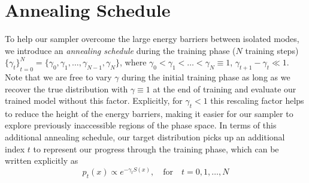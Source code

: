 \documentclass{article} %
\begin{document}
\section{\label{sec:annealing}Annealing Schedule}
%
To help our sampler overcome the large energy barriers between isolated modes, we introduce an \emph{annealing schedule}
during the training phase (\(N\) training steps) \({\{\gamma_{t}\}}_{t=0}^{N} = \{\gamma_{0}, \gamma_{1}, \ldots,
\gamma_{N-1}, \gamma_{N}\}\), where \(\gamma_{0} < \gamma_{1} < \ldots < \gamma_{N} \equiv 1\), \(\gamma_{t+1} -
\gamma_{t} \ll 1\).
%
Note that we are free to vary \(\gamma\) during the initial training phase as long as we recover the true distribution
with \(\gamma \equiv 1\) at the end of training and evaluate our trained model without this factor.
%
Explicitly, for \(\gamma_{t} < 1\) this rescaling factor helps to reduce the height of the energy barriers, making it
easier for our sampler to explore previously inaccessible regions of the phase space.
%
In terms of this additional annealing schedule, our target distribution picks up an additional index \(t\) to represent
our progress through the training phase, which can be written explicitly as 
%
\begin{equation}
   p_{t}(x)\propto e^{-\gamma_{t} S(x)},\quad\text{for}\quad t=0, 1, \ldots, N
   \label{eq:targetannealing}
\end{equation}
%
\end{document}
